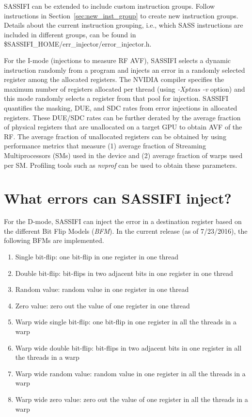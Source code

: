SASSIFI can be extended to include custom instruction groups. Follow
instructions in Section~\ref{sec:new_inst_group} to create new instruction
groups. Details about the current instruction grouping, i.e., which SASS
instructions are included in different groups, can be found in
\$SASSIFI\_HOME/err\_injector/error\_injector.h.


For the I-mode (injections to measure RF AVF), SASSIFI selects a dynamic
instruction randomly from a program and injects an error in a randomly selected
register among the allocated registers. The NVIDIA compiler specifies the
maximum number of registers allocated per thread (using {\it -Xptxas -v}
option) and this mode randomly selects a register from that pool for injection.
SASSIFI quantifies the masking, DUE, and SDC rates from error injections in
allocated registers.  These DUE/SDC rates can be further derated by the average
fraction of physical registers that are unallocated on a target GPU to obtain
AVF of the RF.  The average fraction of unallocated registers can be obtained
by using performance metrics that measure (1) average fraction of Streaming
Multiprocessors (SMs) used in the device and (2) average fraction of warps used
per SM. Profiling tools such as {\it nvprof} can be used to obtain these
parameters.  

\section{What errors can SASSIFI inject?}
\label{sec:what}

For the D-mode, SASSIFI can inject the error in a destination register based on
the different Bit Flip Models ({\it BFM}).  In the current release (as of
7/23/2016), the following BFMs are implemented. 

\begin{enumerate}
\item Single bit-flip: one bit-flip in one register in one thread
\item Double bit-flip: bit-flips in two adjacent bits in one register in one thread
\item Random value: random value in one register in one thread
\item Zero value: zero out the value of one register in one thread
\item Warp wide single bit-flip: one bit-flip in one register in all the threads in a warp
\item Warp wide double bit-flip: bit-flips in two adjacent bits in one register in all the threads in a warp
\item Warp wide random value: random value in one register in all the threads in a warp
\item Warp wide zero value: zero out the value of one register in all the threads in a warp
\end{enumerate}

